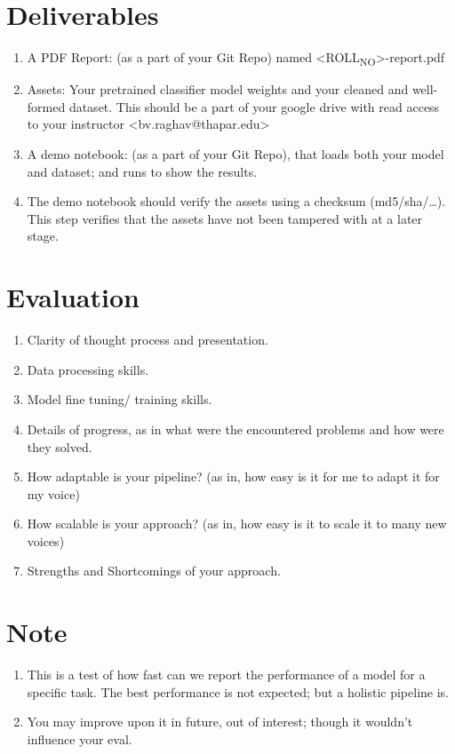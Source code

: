 \documentclass[11pt]{article}
\begin{document}
\section{Deliverables}
\label{sec:org8cf1853}
\begin{enumerate}
\item A PDF Report: (as a part of your Git Repo) named
<ROLL\textsubscript{NO}>-report.pdf
\item Assets: Your pretrained classifier model weights and your
cleaned and well-formed dataset.  This should be a
part of your google drive with read access to your
instructor <bv.raghav@thapar.edu>
\item A demo notebook: (as a part of your Git Repo), that
loads both your model and dataset; and runs to show
the results.
\item The demo notebook should verify the assets using a
checksum (md5/sha/…).  This step verifies that the
assets have not been tampered with at a later stage.
\end{enumerate}


\section{Evaluation}
\label{sec:org9f1dcd4}
\begin{enumerate}
\item Clarity of thought process and presentation.
\item Data processing skills.
\item Model fine tuning/ training skills.
\item Details of progress, as in what were the encountered
problems and how were they solved.
\item How adaptable is your pipeline? (as in, how easy is
it for me to adapt it for my voice)
\item How scalable is your approach? (as in, how easy is
it to scale it to many new voices)
\item Strengths and Shortcomings of your approach.
\end{enumerate}


\section{Note}
\label{sec:orgd18e514}
\begin{enumerate}
\item This is a test of how fast can we report the
performance of a model for a specific task.  The
best performance is not expected; but a holistic
pipeline is.
\item You may improve upon it in future, out of interest;
though it wouldn’t influence your eval.
\end{enumerate}
\end{document}
